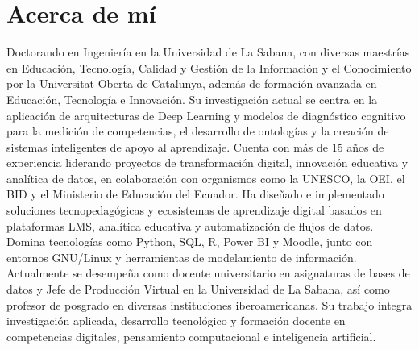 \documentclass[a4paper]{article}
\begin{document}
\section{Acerca de mí}
Doctorando en Ingeniería en la Universidad de La Sabana, con diversas maestrías en Educación, Tecnología, Calidad y Gestión de la Información y el Conocimiento por la Universitat Oberta de Catalunya, además de formación avanzada en Educación, Tecnología e Innovación. Su investigación actual se centra en la aplicación de arquitecturas de Deep Learning y modelos de diagnóstico cognitivo para la medición de competencias, el desarrollo de ontologías y la creación de sistemas inteligentes de apoyo al aprendizaje.
Cuenta con más de 15 años de experiencia liderando proyectos de transformación digital, innovación educativa y analítica de datos, en colaboración con organismos como la UNESCO, la OEI, el BID y el Ministerio de Educación del Ecuador.
Ha diseñado e implementado soluciones tecnopedagógicas y ecosistemas de aprendizaje digital basados en plataformas LMS, analítica educativa y automatización de flujos de datos. Domina tecnologías como Python, SQL, R, Power BI y Moodle, junto con entornos GNU/Linux y herramientas de modelamiento de información.
Actualmente se desempeña como docente universitario en asignaturas de bases de datos y Jefe de Producción Virtual en la Universidad de La Sabana, así como profesor de posgrado en diversas instituciones iberoamericanas. Su trabajo integra investigación aplicada, desarrollo tecnológico y formación docente en competencias digitales, pensamiento computacional e inteligencia artificial.
\end{document}
